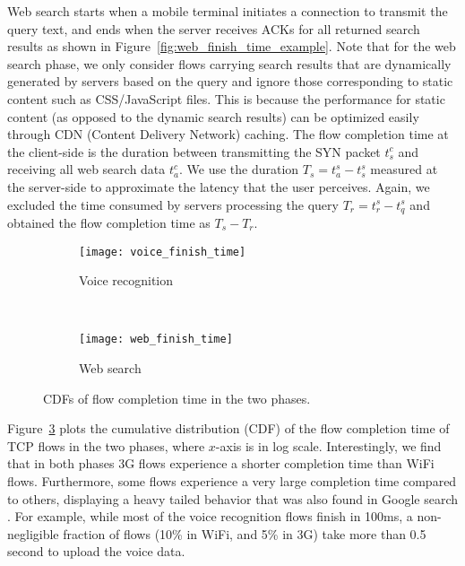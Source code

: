 Web search starts when a mobile terminal initiates a connection to transmit the query text, and ends when the server receives ACKs for all returned search results as shown in Figure~\ref{fig:web_finish_time_example}. Note that for the web search phase, we only consider flows carrying search results that are dynamically generated by servers based on the query and ignore those corresponding to static content such as CSS/JavaScript files. This is because the performance for static content (as opposed to the dynamic search results) can be optimized easily through CDN (Content Delivery Network) caching. The flow completion time at the client-side is the duration between transmitting the SYN packet $t^c_s$ and receiving all web search data $t^c_a$. We use the duration $T_s=t^s_a - t^s_s$ measured at the server-side to approximate the latency that the user perceives. Again, we excluded the time consumed by servers processing the query $T_r=t^s_r - t^s_q$ and obtained the flow completion time as $T_s-T_r$.

\begin{figure}[t]
\centering
\begin{subfigure}[b]{0.8\linewidth}
	\texttt{[image: voice\_finish\_time]}
\caption{Voice recognition}
\label{fig:voice_finish_time}
\end{subfigure} \\
\begin{subfigure}[b]{0.8\linewidth}
	\texttt{[image: web\_finish\_time]}
\caption{Web search}
\label{fig:web_finish_time}
\end{subfigure}
\caption{CDFs of flow completion time in the two phases.}
\label{fig:finish_time}
\minsqueeze
\end{figure}


Figure~\ref{fig:finish_time} plots the cumulative distribution (CDF) of the flow completion time of TCP flows in the two phases, where $x$-axis is in log scale. Interestingly, we find that in both phases 3G flows experience a shorter completion time than WiFi flows. Furthermore, some flows experience a very large completion time compared to others, displaying a heavy tailed behavior that was also found in Google search \cite{flach2013reducing}. For example, while most of the voice recognition flows finish in 100ms, a non-negligible fraction of flows (10\% in WiFi, and 5\% in 3G) take more than 0.5 second to upload the voice data. 


